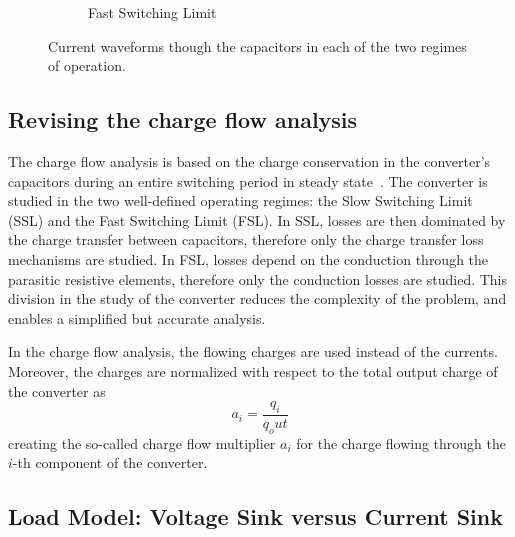 \begin{figure}[!h]
\begin{subfigure}[t]{.45\textwidth}
    \caption{Fast Switching Limit}
    \label{fig:ic_fsl}
\end{subfigure}
\caption[Current waveforms in the converter's capacitors]{Current waveforms though the capacitors in each of the two regimes of operation. }
\label{fig:capacitor_current}
\end{figure}


\subsection{Revising the charge flow analysis}

The charge flow analysis is based on the charge conservation in the converter's capacitors during an entire switching period in steady state~\cite{95Makowski}. The converter is studied in the two well-defined operating regimes: the Slow Switching Limit (SSL) and the Fast Switching Limit (FSL). In SSL, losses are then dominated by the charge transfer between capacitors, therefore only the charge transfer loss mechanisms are studied.  In FSL, losses depend on the conduction through the parasitic resistive elements, therefore only the conduction losses are studied. This division in the study of the converter reduces the complexity of the problem, and enables a simplified but accurate analysis.

In the charge flow analysis, the flowing charges are used instead of the currents. Moreover, the charges are normalized with respect to the total output charge of the converter as
$$
a_i  = \frac{q_i}{q_out}
$$
creating the so-called charge flow multiplier $a_i$ for the charge flowing through the $i$-th component of the converter.


\subsection{Load Model: Voltage Sink versus Current Sink}

